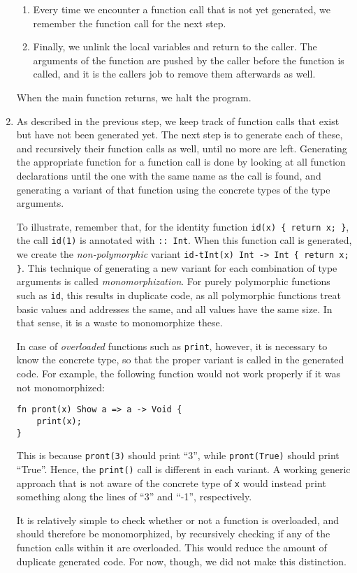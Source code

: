 \begin{enumerate}
\begin{enumerate}
        \item Every time we encounter a function call that is not yet generated, we remember the function call for the next step.
        \item Finally, we unlink the local variables and return to the caller. The arguments of the function are pushed by the caller before the function is called, and it is the callers job to remove them afterwards as well.
    \end{enumerate}
    When the main function returns, we halt the program.
    \item As described in the previous step, we keep track of function calls that exist but have not been generated yet. The next step is to generate each of these, and recursively their function calls as well, until no more are left. Generating the appropriate function for a function call is done by looking at all function declarations until the one with the same name as the call is found, and generating a variant of that function using the concrete types of the type arguments.
    
    To illustrate, remember that, for the identity function \lstinline|id(x) { return x; }|, the call \lstinline|id(1)| is annotated with \lstinline|:: Int|. When this function call is generated, we create the \textit{non-polymorphic} variant \lstinline|id-tInt(x) Int -> Int { return x; }|. This technique of generating a new variant for each combination of type arguments is called \textit{monomorphization}. For purely polymorphic functions such as \lstinline|id|, this results in duplicate code, as all polymorphic functions treat basic values and addresses the same, and all values have the same size. In that sense, it is a waste to monomorphize these.
    
    In case of \textit{overloaded} functions such as \lstinline|print|, however, it is necessary to know the concrete type, so that the proper variant is called in the generated code. For example, the following function would not work properly if it was not monomorphized:
\begin{lstlisting}
fn pront(x) Show a => a -> Void {
    print(x);
}
\end{lstlisting}
    This is because \lstinline|pront(3)| should print ``3'', while \lstinline|pront(True)| should print ``True''. Hence, the \lstinline|print()| call is different in each variant. A working generic approach that is not aware of the concrete type of \lstinline|x| would instead print something along the lines of ``3'' and ``-1'', respectively.
    
    It is relatively simple to check whether or not a function is overloaded, and should therefore be monomorphized, by recursively checking if any of the function calls within it are overloaded. This would reduce the amount of duplicate generated code. For now, though, we did not make this distinction.
\end{enumerate}

